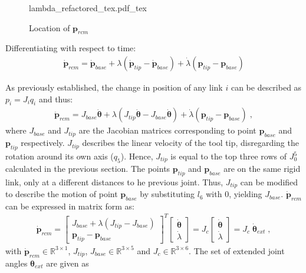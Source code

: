 \begin{figure}[t!]
	\begin{center}
		{lambda_refactored_tex.pdf_tex}
		\caption{Location of $\bm{p}_{rcm}$}
		\label{lambda}
	\end{center}
\end{figure}

Differentiating with respect to time:
\begin{eqnarray}
	\bm{\dot{p}}_{rcm} = \bm{\dot{p}}_{base}+\lambda(\bm{\dot{p}}_{tip} - \bm{\dot{p}}_{base})+\dot{\lambda}(\bm{p}_{tip} - \bm{p}_{base})
\end{eqnarray}

As previously established, the change in position of any link $i$ can be described as $p_i = J_i q_i$ and thus:
\begin{eqnarray}
	\bm{\dot{p}}_{rcm}=J_{base}\bm{\dot{\theta}}+\lambda(J_{tip}\bm{\dot{\theta}}-J_{base}\bm{\dot{\theta}})+\dot{\lambda}(\bm{p}_{tip}-\bm{p}_{base}) \; ,
\end{eqnarray}
where $J_{base}$ and $J_{tip}$ are the Jacobian matrices corresponding to point $\bm{p}_{base}$ and $\bm{p}_{tip}$ respectively. $J_{tip}$ describes the linear velocity of the tool tip, disregarding the rotation around its own axis ($q_5$). Hence, $J_{tip}$ is equal to the top three rows of $J_0^5$ calculated in the previous section. The points $\bm{p}_{tip}$ and $\bm{p}_{base}$ are on the same rigid link, only at a different distances to he previous joint. Thus, $J_{tip}$ can be modified to describe the motion of point $\bm{p}_{base}$ by substituting $l_6$ with 0, yielding $J_{base}$.
$\bm{\dot{p}}_{rcm}$ can be expressed in matrix form as: 
\begin{eqnarray}
	\bm{\dot{p}}_{rcm} =
		\begin{bmatrix}
			J_{base}+\lambda(J_{tip}-J_{base}) \\[2pt]
			\bm{p}_{tip} - \bm{p}_{base}
		\end{bmatrix}^T
		\begin{bmatrix}
			\bm{\dot{\theta}} \\[2pt]
			\dot{\lambda}
		\end{bmatrix}
	= J_{c}
		\begin{bmatrix}
			\bm{\dot{\theta}} \\[2pt]
			\dot{\lambda}
		\end{bmatrix} 
	= J_{c} \; \bm{\dot{\theta}}_{ext} \; ,
\end{eqnarray}			
with $\bm{\dot{p}}_{rcm} \in \mathbb{R}^{3\times1}$,  $J_{tip}$, $J_{base} \in \mathbb{R}^{3\times5}$ and $J_{c} \in \mathbb{R}^{3\times6}$. The set of extended joint angles $\bm{\theta}_{ext}$ are given as 
